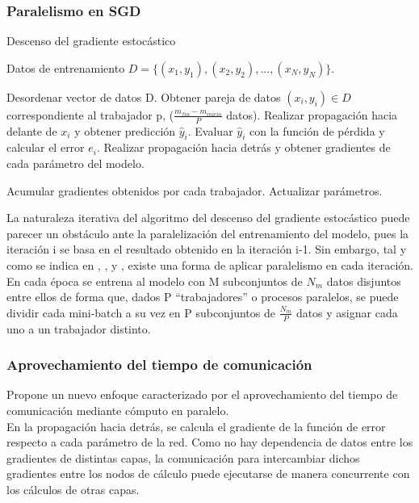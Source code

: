 \subsubsection{Paralelismo en SGD}
\begin{algorithm}[H]
	\caption{Descenso del gradiente estocástico \cite{CNN_parallel_International_Conference}} 
	\begin{algorithmic}
		\State Datos de entrenamiento $D=\{(x_1, y_1), (x_2, y_2), ..., (x_N, y_N)\}$.
		
			\State Desordenar vector de datos D.
					\State Obtener pareja de datos $(x_i, y_i) \in D$ correspondiente 
					\State al trabajador p, ($\frac{m_{fin} - m_{inicio}}{P}$ datos).
					\State Realizar propagación hacia delante de $x_i$ y obtener 
					\State predicción $\hat{y}_i$.
					\State Evaluar $\hat{y}_i$ con la función de pérdida y calcular el error $e_i$.
					\State Realizar propagación hacia detrás y obtener gradientes 
					\State de cada parámetro del modelo.
				\EndFor
				
				\State Acumular gradientes obtenidos por cada trabajador.
				\State Actualizar parámetros.
				
			\EndFor
		\EndFor
	\end{algorithmic}
\end{algorithm}

La naturaleza iterativa del algoritmo del descenso del gradiente estocástico puede parecer un obstáculo ante la paralelización del entrenamiento del modelo, pues la iteración i se basa en el resultado obtenido en la iteración i-1. Sin embargo, tal y como se indica en \cite{CNN_parallel_Stanford}, \cite{CNN_parallel_International_Conference}, y \cite{CNN_parallel_Ome_Weird_Trick}, existe una forma de aplicar paralelismo en cada iteración. \\
En cada época se entrena al modelo con M subconjuntos de $N_m$ datos disjuntos entre ellos de forma que, dados P ``trabajadores'' o procesos paralelos, se puede dividir cada mini-batch a su vez en P subconjuntos de $\frac{N_m}{P}$ datos y asignar cada uno a un trabajador distinto.\\

\subsubsection{Aprovechamiento del tiempo de comunicación}
\cite{CNN_parallel_International_Conference} Propone un nuevo enfoque caracterizado por el aprovechamiento del tiempo de comunicación mediante cómputo en paralelo. \\
En la propagación hacia detrás, se calcula el gradiente de la función de error respecto a cada parámetro de la red. Como no hay dependencia de datos entre los gradientes de distintas capas, la comunicación para intercambiar dichos gradientes entre los nodos de cálculo puede ejecutarse de manera concurrente con los cálculos de otras capas.

